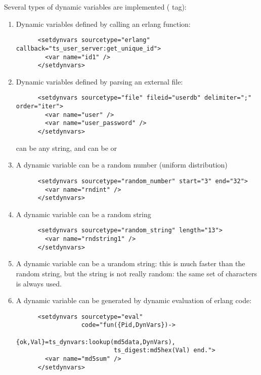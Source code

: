 \documentclass{TSUNG-en}
\begin{document}
Several types of dynamic variables are implemented ( tag):
\begin{enumerate}
\item Dynamic variables defined by calling an erlang function:
\begin{Verbatim}
      <setdynvars sourcetype="erlang" callback="ts_user_server:get_unique_id">
        <var name="id1" />
      </setdynvars>
\end{Verbatim}
\item Dynamic variables defined by parsing an external file:
\begin{Verbatim}
      <setdynvars sourcetype="file" fileid="userdb" delimiter=";" order="iter">
        <var name="user" />
        <var name="user_password" />
      </setdynvars>
\end{Verbatim}
 can be any string, and  can be
 or 
\item A dynamic variable can be a random number (uniform distribution)
\begin{Verbatim}
      <setdynvars sourcetype="random_number" start="3" end="32">
        <var name="rndint" />
      </setdynvars>
\end{Verbatim}
\item A dynamic variable can be a random string
\begin{Verbatim}
      <setdynvars sourcetype="random_string" length="13">
        <var name="rndstring1" />
      </setdynvars>
\end{Verbatim}
\item A dynamic variable can be a urandom string: this is much faster than
  the random string, but the string is not really random: the same set
  of characters is always used.
\item A dynamic variable can be generated by dynamic evaluation of
  erlang code:
\begin{Verbatim}
      <setdynvars sourcetype="eval"
                  code="fun({Pid,DynVars})->
                           {ok,Val}=ts_dynvars:lookup(md5data,DynVars),
                           ts_digest:md5hex(Val) end.">
        <var name="md5sum" />
      </setdynvars>
\end{Verbatim}


\end{enumerate}
\end{document}

